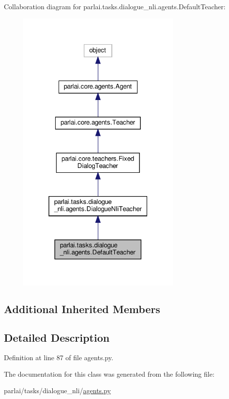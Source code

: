 Collaboration diagram for parlai.\+tasks.\+dialogue\+\_\+nli.\+agents.\+Default\+Teacher\+:\nopagebreak
\begin{figure}[H]
\begin{center}
\leavevmode
\includegraphics[width=232pt]{dc/d2d/classparlai_1_1tasks_1_1dialogue__nli_1_1agents_1_1DefaultTeacher__coll__graph}
\end{center}
\end{figure}
\subsection*{Additional Inherited Members}


\subsection{Detailed Description}


Definition at line 87 of file agents.\+py.



The documentation for this class was generated from the following file\+:\begin{DoxyCompactItemize}
\item 
parlai/tasks/dialogue\+\_\+nli/\hyperlink{parlai_2tasks_2dialogue__nli_2agents_8py}{agents.\+py}\end{DoxyCompactItemize}

